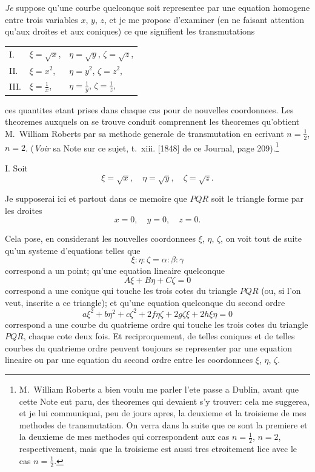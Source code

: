 \documentclass[12pt,a4paper]{article}
\begin{document}
\textit{Je} suppose qu'une courbe quelconque soit representee par une equation homogene entre trois variables $x$, $y$, $z$, et je me propose d'examiner (en ne faisant attention qu'aux droites et aux coniques) ce que signifient les transmutations
\begin{center}
\begin{tabular}{lll}
I. & $\xi = \sqrt{x}$, & $\eta = \sqrt{y}$, \quad $\zeta = \sqrt{z}$, \\[4pt]
II. & $\xi = x^2$, & $\eta = y^2$, \quad $\zeta = z^2$, \\[4pt]
III. & $\displaystyle\xi = \frac{1}{x}$, & $\displaystyle\eta = \frac{1}{y}$, \quad $\displaystyle\zeta = \frac{1}{z}$,
\end{tabular}
\end{center}
ces quantites etant prises dans chaque cas pour de nouvelles coordonnees. Les theoremes auxquels on se trouve conduit comprennent les theoremes qu'obtient M.~William Roberts par sa methode generale de transmutation en ecrivant $n = \frac{1}{2}$, $n = 2$. (\textit{Voir} sa Note sur ce sujet, t.~xiii. [1848] de ce Journal, page 209).\footnote{M.~William Roberts a bien voulu me parler l'ete passe a Dublin, avant que cette Note eut paru, des theoremes qui devaient s'y trouver: cela me suggerea, et je lui communiquai, peu de jours apres, la deuxieme et la troisieme de mes methodes de transmutation. On verra dans la suite que ce sont la premiere et la deuxieme de mes methodes qui correspondent aux cas $n = \frac{1}{2}$, $n = 2$, respectivement, mais que la troisieme est aussi tres etroitement liee avec le cas $n = \frac{1}{2}$.}

\textsc{I.} Soit
\[
\xi = \sqrt{x}, \quad \eta = \sqrt{y}, \quad \zeta = \sqrt{z}.
\]

Je supposerai ici et partout dans ce memoire que $PQR$ soit le triangle forme par les droites
\[
x = 0, \quad y = 0, \quad z = 0.
\]

Cela pose, en considerant les nouvelles coordonnees $\xi$, $\eta$, $\zeta$, on voit tout de suite qu'un systeme d'equations telles que
\[
\xi : \eta : \zeta = \alpha : \beta : \gamma
\]
correspond a un point; qu'une equation lineaire quelconque
\[
A\xi + B\eta + C\zeta = 0
\]
correspond a une conique qui touche les trois cotes du triangle $PQR$ (ou, si l'on veut, inscrite a ce triangle); et qu'une equation quelconque du second ordre
\[
a\xi^2 + b\eta^2 + c\zeta^2 + 2f\eta\zeta + 2g\zeta\xi + 2h\xi\eta = 0
\]
correspond a une courbe du quatrieme ordre qui touche les trois cotes du triangle $PQR$, chaque cote deux fois. Et reciproquement, de telles coniques et de telles courbes du quatrieme ordre peuvent toujours se representer par une equation lineaire ou par une equation du second ordre entre les coordonnees $\xi$, $\eta$, $\zeta$.
\end{document}

